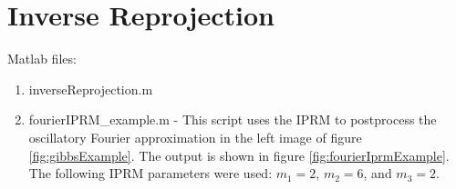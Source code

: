 \documentclass[12pt]{article}
\begin{document}
\section{Inverse Reprojection}

Matlab files:
\begin{enumerate}
  \item inverseReprojection.m
  \item fourierIPRM\_example.m - This script uses the IPRM to postprocess the oscillatory Fourier approximation in the left image of figure \ref{fig:gibbsExample}. The output is shown in figure \ref{fig:fourierIprmExample}.  The following IPRM parameters were used: $m_1 = 2$, $m_2=6$, and $m_3=2$.
\end{enumerate}

\begin{figure}[tbh]
   \centering

\end{figure}
\end{document}
